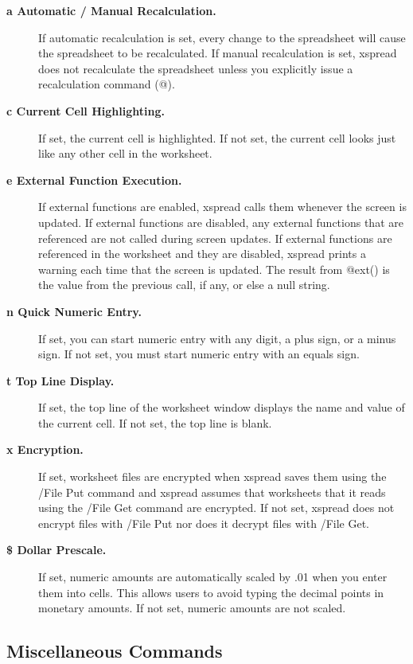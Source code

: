 \begin{description}
\item[{\bf a   Automatic / Manual Recalculation.}]{If automatic recalculation is set,
every change to the spreadsheet will cause the spreadsheet to be 
recalculated.  If manual recalculation is set, xspread does not 
recalculate the spreadsheet unless you explicitly issue a recalculation command
(@).}

\item[{\bf c   Current Cell Highlighting.}]{  If set, the current cell is highlighted.
If not set, the current cell looks just like any other cell in the 
worksheet.}

\item[{\bf e   External Function Execution.}]{If external functions are enabled,
xspread calls them whenever the screen is updated.  If external 
functions are disabled, any external functions that are referenced are 
not called during screen updates.  If external functions are 
referenced in the worksheet and they are disabled, xspread prints a 
warning each time that the screen is updated.  The result from @ext() 
is the value from the previous call, if any, or else a null string.}

\item[{\bf n   Quick Numeric Entry.}]{  If set, you can start numeric entry with any
digit, a plus sign, or a minus sign.  If not set, you must start 
numeric entry with an equals sign.}

\item[{\bf t   Top Line Display.}]{  If set, the top line of the worksheet window
displays the name and value of the current cell.  If not set, the top 
line is blank.}

\item[{\bf  x   Encryption.}]{  If set, worksheet files are encrypted when xspread saves
them using the /File Put command and xspread assumes that worksheets 
that it reads using the /File Get command are encrypted.  If not set, 
xspread does not encrypt files with /File Put nor does it decrypt 
files with /File Get.}

\item[{\bf \$   Dollar Prescale.}]{  If set, numeric amounts are automatically scaled by
.01 when you enter them into cells.  This allows users to avoid typing 
the decimal points in monetary amounts.  If not set, numeric amounts 
are not scaled.}
\end{description}

\subsection*{Miscellaneous Commands}

